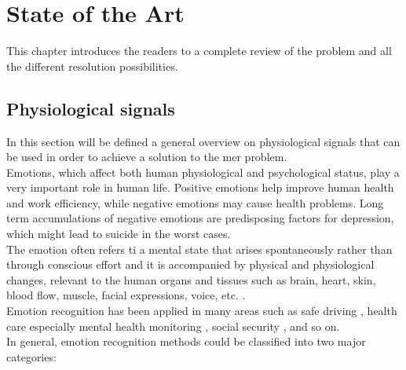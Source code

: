 \chapter{State of the Art}
\label{chap:StateOfTheArt}
\pagestyle{plain}
\vspace{0.5cm}

\noindent This chapter introduces the readers to a complete review of the problem and all the different resolution possibilities.

\section{Physiological signals}
In this section will be defined a general overview on physiological signals that can be used in order to achieve a solution to the \gls{mer} problem.
\\ \indent
Emotions, which affect both human physiological and psychological status, play a very important role in human life. Positive emotions help improve human health and work efficiency, while negative emotions may cause health problems. Long term accumulations of negative emotions are predisposing factors for depression, which might lead to suicide in the worst cases.
\\
The emotion often refers ti a mental state that arises spontaneously rather than through conscious effort and it is accompanied by physical and physiological changes, relevant to the human organs and tissues such as brain, heart, skin, blood flow, muscle, facial expressions, voice, etc. \cite{shu2018review}.
\\ \indent
Emotion recognition has been applied in many areas such as safe driving \cite{de2016enhancing}, health care especially mental health monitoring \cite{guo2013pervasive}, social security \cite{verschuere2006psychopathy}, and so on.
\\
In general, emotion recognition methods could be classified into two major categories:

